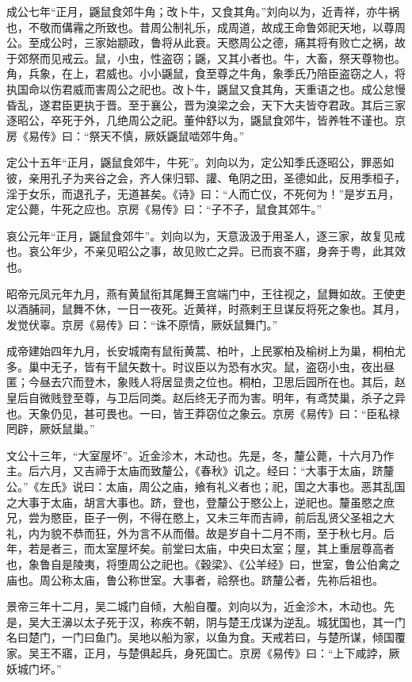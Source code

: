 \documentclass[]{article}
\begin{document}
成公七年``正月，鼷鼠食郊牛角；改卜牛，又食其角。''刘向以为，近青祥，亦牛祸也，不敬而傋霿之所致也。昔周公制礼乐，成周道，故成王命鲁郊祀天地，以尊周公。至成公时，三家始颛政，鲁将从此衰。天愍周公之德，痛其将有败亡之祸，故于郊祭而见戒云。鼠，小虫，性盗窃；鼷，又其小者也。牛，大畜，祭天尊物也。角，兵象，在上，君威也。小小鼷鼠，食至尊之牛角，象季氏乃陪臣盗窃之人，将执国命以伤君威而害周公之祀也。改卜牛，鼷鼠又食其角，天重语之也。成公怠慢昏乱，遂君臣更执于晋。至于襄公，晋为溴梁之会，天下大夫皆夺君政。其后三家逐昭公，卒死于外，几绝周公之祀。董仲舒以为，鼷鼠食郊牛，皆养牲不谨也。京房《易传》曰：``祭天不慎，厥妖鼷鼠啮郊牛角。''

定公十五年``正月，鼷鼠食郊牛，牛死''。刘向以为，定公知季氏逐昭公，罪恶如彼，亲用孔子为夹谷之会，齐人俫归郓、讙、龟阴之田，圣德如此，反用季桓子，淫于女乐，而退孔子，无道甚矣。《诗》曰：``人而亡仪，不死何为！''是岁五月，定公薨，牛死之应也。京房《易传》曰：``子不子，鼠食其郊牛。''

哀公元年``正月，鼷鼠食郊牛''。刘向以为，天意汲汲于用圣人，逐三家，故复见戒也。哀公年少，不亲见昭公之事，故见败亡之异。已而哀不寤，身奔于粤，此其效也。

昭帝元凤元年九月，燕有黄鼠衔其尾舞王宫端门中，王往视之，鼠舞如故。王使吏以酒脯祠，鼠舞不休，一日一夜死。近黄祥，时燕剌王旦谋反将死之象也。其月，发觉伏辜。京房《易传》曰：``诛不原情，厥妖鼠舞门。''

成帝建始四年九月，长安城南有鼠衔黄蒿、柏叶，上民冢柏及榆树上为巢，桐柏尤多。巢中无子，皆有干鼠矢数十。时议臣以为恐有水灾。鼠，盗窃小虫，夜出昼匿；今昼去穴而登木，象贱人将居显贵之位也。桐柏，卫思后园所在也。其后，赵皇后自微贱登至尊，与卫后同类。赵后终无子而为害。明年，有鸢焚巢，杀子之异也。天象仍见，甚可畏也。一曰，皆王莽窃位之象云。京房《易传》曰：``臣私禄罔辟，厥妖鼠巢。''

文公十三年，``大室屋坏''。近金沴木，木动也。先是，冬，釐公薨，十六月乃作主。后六月，又吉禘于太庙而致釐公，《春秋》讥之。经曰：``大事于太庙，跻釐公。''《左氏》说曰：太庙，周公之庙，飨有礼义者也；祀，国之大事也。恶其乱国之大事于太庙，胡言大事也。跻，登也，登釐公于愍公上，逆祀也。釐虽愍之庶兄，尝为愍臣，臣子一例，不得在愍上，又未三年而吉禘，前后乱贤父圣祖之大礼，内为貌不恭而狂，外为言不从而僣。故是岁自十二月不雨，至于秋七月。后年，若是者三，而太室屋坏矣。前堂曰太庙，中央曰太室；屋，其上重层尊高者也，象鲁自是陵夷，将堕周公之祀也。《穀梁》、《公羊经》曰，世室，鲁公伯禽之庙也。周公称太庙，鲁公称世室。大事者，祫祭也。跻釐公者，先祢后祖也。

景帝三年十二月，吴二城门自倾，大船自覆。刘向以为，近金沴木，木动也。先是，吴大王濞以太子死于汉，称疾不朝，阴与楚王戊谋为逆乱。城犹国也，其一门名曰楚门，一门曰鱼门。吴地以船为家，以鱼为食。天戒若曰，与楚所谋，倾国覆家。吴王不寤，正月，与楚俱起兵，身死国亡。京房《易传》曰：``上下咸誖，厥妖城门坏。''
\end{document}
